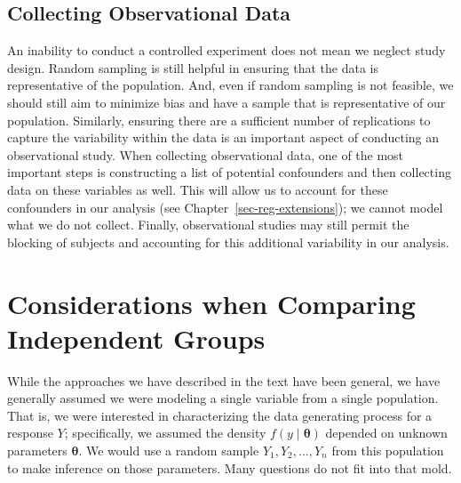 \documentclass[
  letterpaper,
  DIV=11,
  numbers=noendperiod]{scrreprt}
\theoremstyle{definition}
\theoremstyle{plain}
\theoremstyle{definition}
\theoremstyle{remark}
\begin{document}
\hypertarget{collecting-observational-data}{%
\section{Collecting Observational
Data}\label{collecting-observational-data}}

An inability to conduct a controlled experiment does not mean we neglect
study design. Random sampling is still helpful in ensuring that the data
is representative of the population. And, even if random sampling is not
feasible, we should still aim to minimize bias and have a sample that is
representative of our population. Similarly, ensuring there are a
sufficient number of replications to capture the variability within the
data is an important aspect of conducting an observational study. When
collecting observational data, one of the most important steps is
constructing a list of potential confounders and then collecting data on
these variables as well. This will allow us to account for these
confounders in our analysis (see Chapter~\ref{sec-reg-extensions}); we
cannot model what we do not collect. Finally, observational studies may
still permit the blocking of subjects and accounting for this additional
variability in our analysis.

\hypertarget{sec-independent-groups}{%
\chapter{Considerations when Comparing Independent
Groups}\label{sec-independent-groups}}

\providecommand{\norm}[1]{\lVert#1\rVert}
\providecommand{\abs}[1]{\lvert#1\rvert}
\providecommand{\iid}{\stackrel{\text{IID}}{\sim}}
\providecommand{\ind}{\stackrel{\text{Ind}}{\sim}}

\providecommand{\bm}[1]{\mathbf{#1}}
\providecommand{\bs}[1]{\boldsymbol{#1}}
\providecommand{\bbeta}{\bs{\beta}}

\providecommand{\Ell}{\mathcal{L}}
\providecommand{\indep}{\perp\negthickspace\negmedspace\perp}

While the approaches we have described in the text have been general, we
have generally assumed we were modeling a single variable from a single
population. That is, we were interested in characterizing the data
generating process for a response \(Y\); specifically, we assumed the
density \(f(y \mid \boldsymbol{\theta})\) depended on unknown parameters
\(\boldsymbol{\theta}\). We would use a random sample
\(Y_1, Y_2, \dots, Y_n\) from this population to make inference on those
parameters. Many questions do not fit into that mold.
\end{document}
